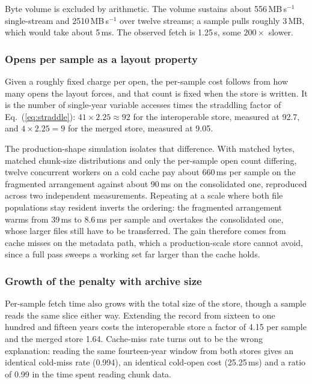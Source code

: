\documentclass[gmd, manuscript]{copernicus}
\begin{document}
Byte volume is excluded by arithmetic. The volume sustains about 556\,MB\,s$^{-1}$
single-stream and 2510\,MB\,s$^{-1}$ over twelve streams; a sample pulls roughly 3\,MB, which
would take about 5\,ms. The observed fetch is 1.25\,s, some $200\times$ slower.

\subsubsection{Opens per sample as a layout property}
\label{sec:finding-layout}

Given a roughly fixed charge per open, the per-sample cost follows from how many opens the
layout forces, and that count is fixed when the store is written. It is the number of
single-year variable accesses times the straddling factor of Eq.~(\ref{eq:straddle}):
$41 \times 2.25 \approx 92$ for the interoperable store, measured at 92.7, and
$4 \times 2.25 = 9$ for the merged store, measured at 9.05.

The production-shape simulation isolates that difference. With matched bytes, matched
chunk-size distributions and only the per-sample open count differing, twelve concurrent
workers on a cold cache pay about 660\,ms per sample on the fragmented arrangement against
about 90\,ms on the consolidated one, reproduced across two independent measurements. Repeating
at a scale where both file populations stay resident inverts the ordering: the fragmented
arrangement warms from 39\,ms to 8.6\,ms per sample and overtakes the consolidated one, whose
larger files still have to be transferred. The gain therefore comes from cache misses on the
metadata path, which a production-scale store cannot avoid, since a full pass sweeps a working
set far larger than the cache holds.

\subsubsection{Growth of the penalty with archive size}
\label{sec:finding-size}

Per-sample fetch time also grows with the total size of the store, though a sample reads the
same slice either way. Extending the record from sixteen to one hundred and fifteen years costs
the interoperable store a factor of 4.15 per sample and the merged store 1.64. Cache-miss rate
turns out to be the wrong explanation: reading the same fourteen-year window from both stores
gives an identical cold-miss rate (0.994), an identical cold-open cost (25.25\,ms) and a ratio
of 0.99 in the time spent reading chunk data.
\end{document}
